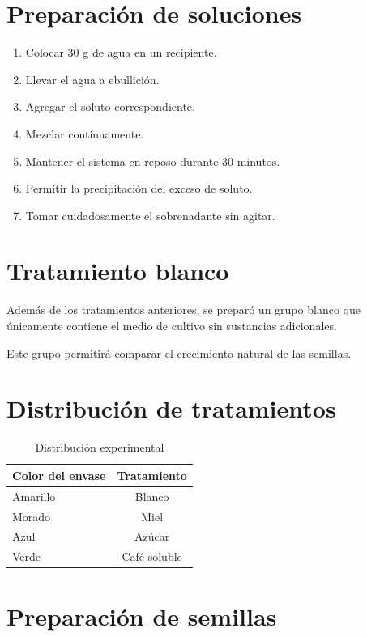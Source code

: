 \documentclass[compacto,10pt,comentarios]{aleph-notas}
\begin{document}
\section{Preparación de soluciones}

\begin{enumerate}
\item Colocar 30 g de agua en un recipiente.
\item Llevar el agua a ebullición.
\item Agregar el soluto correspondiente.
\item Mezclar continuamente.
\item Mantener el sistema en reposo durante 30 minutos.
\item Permitir la precipitación del exceso de soluto.
\item Tomar cuidadosamente el sobrenadante sin agitar.
\end{enumerate}

\section{Tratamiento blanco}

Además de los tratamientos anteriores, se preparó un grupo blanco que únicamente contiene el medio de cultivo sin sustancias adicionales.

Este grupo permitirá comparar el crecimiento natural de las semillas.

\section{Distribución de tratamientos}

\begin{table}[H]
\centering
\begin{tabular}{lc}
\toprule
Color del envase & Tratamiento \\
\midrule
Amarillo & Blanco \\
Morado & Miel \\
Azul & Azúcar \\
Verde & Café soluble \\
\bottomrule
\end{tabular}
\caption{Distribución experimental}
\end{table}

\section{Preparación de semillas}
\end{document}
